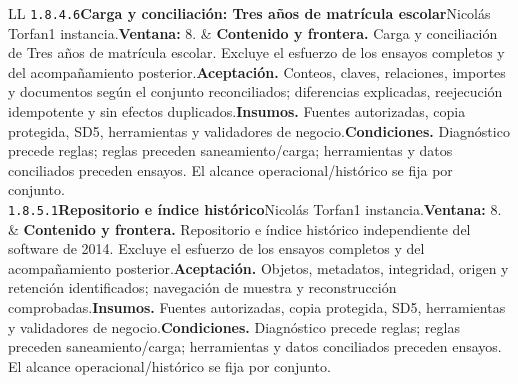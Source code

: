 \begin{longtable}{L{\tabcolsep\relax}L{\tabcolsep\relax}}
\texttt{1.\allowbreak{}8.\allowbreak{}4.\allowbreak{}6}\newline{}\textbf{Carga y conciliación: Tres años de matrícula escolar}\newline{}Nicolás Torfan\newline{}1 instancia.\newline{}\textbf{Ventana:} 8. & \textbf{Contenido y frontera.} Carga y conciliación de Tres años de matrícula escolar. Excluye el esfuerzo de los ensayos completos y del acompañamiento posterior.\newline{}\textbf{Aceptación.} Conteos, claves, relaciones, importes y documentos según el conjunto reconciliados; diferencias explicadas, reejecución idempotente y sin efectos duplicados.\newline{}\textbf{Insumos.} Fuentes autorizadas, copia protegida, SD5, herramientas y validadores de negocio.\newline{}\textbf{Condiciones.} Diagnóstico precede reglas; reglas preceden saneamiento/carga; herramientas y datos conciliados preceden ensayos. El alcance operacional/histórico se fija por conjunto.\\\hline
\texttt{1.\allowbreak{}8.\allowbreak{}5.\allowbreak{}1}\newline{}\textbf{Repositorio e índice histórico}\newline{}Nicolás Torfan\newline{}1 instancia.\newline{}\textbf{Ventana:} 8. & \textbf{Contenido y frontera.} Repositorio e índice histórico independiente del software de 2014. Excluye el esfuerzo de los ensayos completos y del acompañamiento posterior.\newline{}\textbf{Aceptación.} Objetos, metadatos, integridad, origen y retención identificados; navegación de muestra y reconstrucción comprobadas.\newline{}\textbf{Insumos.} Fuentes autorizadas, copia protegida, SD5, herramientas y validadores de negocio.\newline{}\textbf{Condiciones.} Diagnóstico precede reglas; reglas preceden saneamiento/carga; herramientas y datos conciliados preceden ensayos. El alcance operacional/histórico se fija por conjunto.\\\hline

\end{longtable}
